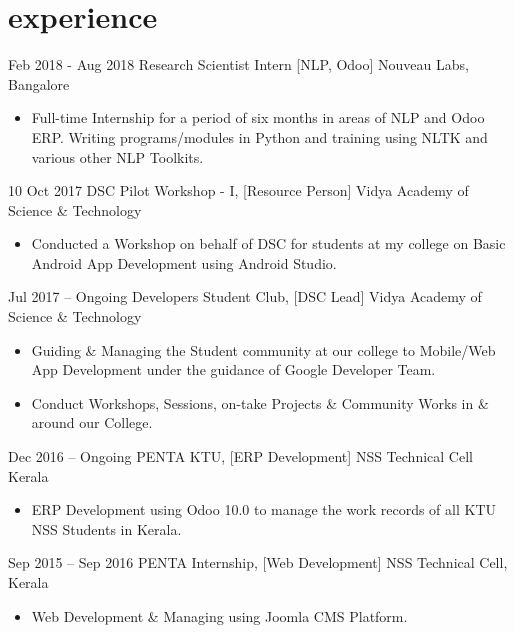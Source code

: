 \documentclass[]{friggeri-cv}
\begin{document}
\section{experience}
\begin{entrylist}
	\entry
	{Feb 2018 - Aug 2018}
	{Research Scientist Intern [NLP, Odoo]}
	{Nouveau Labs, Bangalore}
	{\vspace{-3mm}\begin{itemize}[leftmargin=10pt,itemsep=1pt]
		\item Full-time Internship for a period of six months in areas of NLP and Odoo ERP. Writing programs/modules in Python and training using NLTK and various other NLP Toolkits.
	\end{itemize}}
	\entry
	{10 Oct 2017}
	{DSC Pilot Workshop - I, [Resource Person]}
	{Vidya Academy of Science \& Technology}
	{\vspace{-3mm}\begin{itemize}[leftmargin=10pt,itemsep=1pt]
		\item Conducted a Workshop on behalf of DSC for students at my college on Basic Android App Development using Android Studio.
		\end{itemize}}
	\entry
	{Jul 2017 – Ongoing}
	{Developers Student Club, [DSC Lead]}
	{Vidya Academy of Science \& Technology}
	{\vspace{-3mm}\begin{itemize}[leftmargin=10pt,itemsep=1pt]
		\item Guiding \& Managing the Student community at our college to Mobile/Web App Development under the guidance of Google Developer Team.
		\item Conduct Workshops, Sessions, on-take Projects \& Community Works in \& around our College.
		\end{itemize}}
	\entry
	{Dec 2016 – Ongoing}
	{PENTA KTU, [ERP Development]}
	{NSS Technical Cell Kerala}
	{\vspace{-3mm}\begin{itemize}[leftmargin=10pt,itemsep=1pt]
		\item ERP Development using Odoo 10.0 to manage the work records of all KTU NSS Students in Kerala.
		\end{itemize}}
	\entry
	{Sep 2015 – Sep 2016}
	{PENTA Internship, [Web Development]}
	{NSS Technical Cell, Kerala}
	{\vspace{-3mm}\begin{itemize}[leftmargin=10pt,itemsep=1pt]
		\item Web Development \& Managing using Joomla CMS Platform.
		\end{itemize}}
\end{entrylist}\newline
\end{document}
